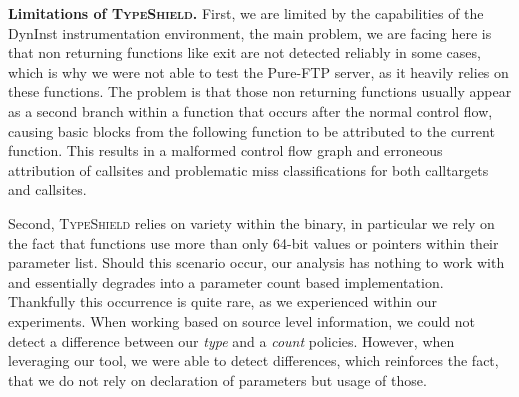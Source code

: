 \textbf{Limitations of \textsc{TypeShield}.}
\label{section:limit}
First, we are limited by the capabilities of the DynInst instrumentation environment, the main problem,
we are facing here is that non returning functions like exit are not detected reliably in some cases, which is
why we were not able to test the Pure-FTP server, as it heavily relies on these functions. The problem is that
those non returning functions usually appear as a second branch within a function that occurs after the normal
control flow, causing basic blocks from the following function to be attributed to the current function. This
results in a malformed control flow graph and erroneous attribution of callsites and problematic miss classifications
for both calltargets and callsites.

Second, \textsc{TypeShield} relies on variety within the binary, in particular we rely on
the fact that functions use more than only 64-bit values or pointers within their parameter list. Should this
scenario occur, our analysis has nothing to work with and essentially degrades into a parameter count based
implementation. Thankfully this occurrence is quite rare, as we experienced within our experiments. When working
based on source level information, we could not detect a difference between our \textit{type} and a \textit{count} policies. 
However, when leveraging our tool, we were able to detect differences, which reinforces the fact, that we do 
not rely on declaration of parameters but usage of those.
